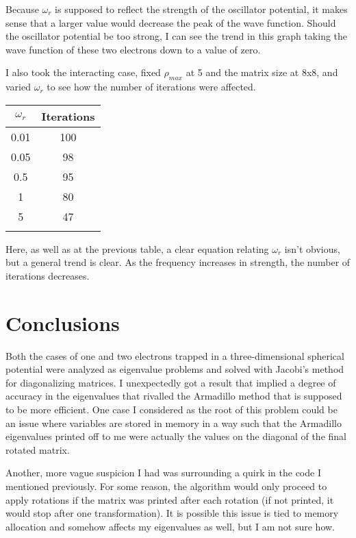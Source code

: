 \documentclass[10pt,showpacs,preprintnumbers,footinbib,amsmath,amssymb,aps,prl,twocolumn,groupedaddress,superscriptaddress,showkeys]{revtex4-1}
\begin{document}
Because $\omega_{r}$ is supposed to reflect the strength of the oscillator potential, it makes sense that a larger value would decrease the peak of the wave function. Should the oscillator potential be too strong, I can see the trend in this graph taking the wave function of these two electrons down to a value of zero.

I also took the interacting case, fixed $\rho_{max}$ at 5 and the matrix size at 8x8, and varied $\omega_{r}$ to see how the number of iterations were affected.

	\begin{center}
		\begin{tabular}{cc}
			\hline \hline
			$\omega_{r}$ & Iterations \\
			\hline		
			0.01 & 100  \\
			0.05  & 98 \\
			0.5 & 95 \\
			1 & 80 \\
			5 & 47 \\
			\hline
			\label{iterationsOmega}
		\end{tabular}
	\end{center}
	
Here, as well as at the previous table, a clear equation relating $\omega_{r}$ isn't obvious, but a general trend is clear. As the frequency increases in strength, the number of iterations decreases.

\section{Conclusions}
	Both the cases of one and two electrons trapped in a three-dimensional spherical potential were analyzed as eigenvalue problems and solved with Jacobi's method for diagonalizing matrices. I unexpectedly got a result that implied a degree of accuracy in the eigenvalues that rivalled the Armadillo method that is supposed to be more efficient. One case I considered as the root of this problem could be an issue where variables are stored in memory in a way such that the Armadillo eigenvalues printed off to me were actually the values on the diagonal of the final rotated matrix. 

Another, more vague suspicion I had was surrounding a quirk in the code I mentioned previously. For some reason, the algorithm would only proceed to apply rotations if the matrix was printed after each rotation (if not printed, it would stop after one transformation). It is possible this issue is tied to memory allocation and somehow affects my eigenvalues as well, but I am not sure how.
\end{document}
